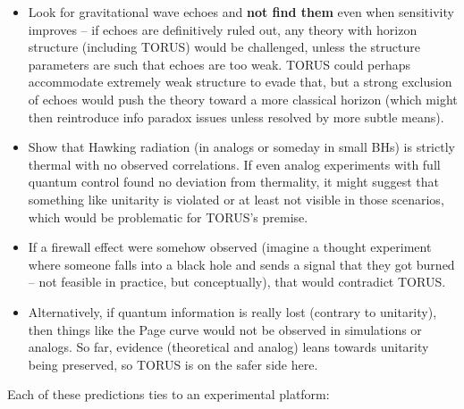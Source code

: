 \documentclass[]{article}
\begin{document}
\begin{itemize}
\item
  Look for gravitational wave echoes and \textbf{not find them} even
  when sensitivity improves -- if echoes are definitively ruled out, any
  theory with horizon structure (including TORUS) would be challenged,
  unless the structure parameters are such that echoes are too weak.
  TORUS could perhaps accommodate extremely weak structure to evade
  that, but a strong exclusion of echoes would push the theory toward a
  more classical horizon (which might then reintroduce info paradox
  issues unless resolved by more subtle means).
\item
  Show that Hawking radiation (in analogs or someday in small BHs) is
  strictly thermal with no observed correlations. If even analog
  experiments with full quantum control found no deviation from
  thermality, it might suggest that something like unitarity is violated
  or at least not visible in those scenarios, which would be problematic
  for TORUS's premise.
\item
  If a firewall effect were somehow observed (imagine a thought
  experiment where someone falls into a black hole and sends a signal
  that they got burned -- not feasible in practice, but conceptually),
  that would contradict TORUS.
\item
  Alternatively, if quantum information is really lost (contrary to
  unitarity), then things like the Page curve would not be observed in
  simulations or analogs. So far, evidence (theoretical and analog)
  leans towards unitarity being preserved, so TORUS is on the safer side
  here.
\end{itemize}

Each of these predictions ties to an experimental platform:
\end{document}
